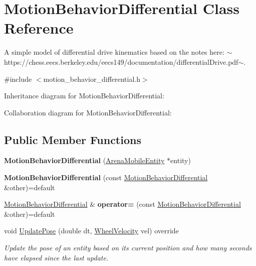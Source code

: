 \hypertarget{classMotionBehaviorDifferential}{}\section{Motion\+Behavior\+Differential Class Reference}
\label{classMotionBehaviorDifferential}


A simple model of differential drive kinematics based on the notes here\+: $\sim$https\+://chess.eecs.\+berkeley.\+edu/eecs149/documentation/differential\+Drive.pdf$\sim$.  




{\ttfamily \#include $<$motion\+\_\+behavior\+\_\+differential.\+h$>$}



Inheritance diagram for Motion\+Behavior\+Differential\+:


Collaboration diagram for Motion\+Behavior\+Differential\+:
\subsection*{Public Member Functions}
\begin{DoxyCompactItemize}
\item 
{\bfseries Motion\+Behavior\+Differential} (\hyperlink{classArenaMobileEntity}{Arena\+Mobile\+Entity} $\ast$entity)\hypertarget{classMotionBehaviorDifferential_a8815791ac85212945862454560279d28}{}\label{classMotionBehaviorDifferential_a8815791ac85212945862454560279d28}

\item 
{\bfseries Motion\+Behavior\+Differential} (const \hyperlink{classMotionBehaviorDifferential}{Motion\+Behavior\+Differential} \&other)=default\hypertarget{classMotionBehaviorDifferential_aeaa480aac3de205e1d177c4b4ad73ed6}{}\label{classMotionBehaviorDifferential_aeaa480aac3de205e1d177c4b4ad73ed6}

\item 
\hyperlink{classMotionBehaviorDifferential}{Motion\+Behavior\+Differential} \& {\bfseries operator=} (const \hyperlink{classMotionBehaviorDifferential}{Motion\+Behavior\+Differential} \&other)=default\hypertarget{classMotionBehaviorDifferential_aaf4edbc2e349cb8cdbb033b16b1aef22}{}\label{classMotionBehaviorDifferential_aaf4edbc2e349cb8cdbb033b16b1aef22}

\item 
void \hyperlink{classMotionBehaviorDifferential_a929c3a05aa2072acf2a508109b1259ef}{Update\+Pose} (double dt, \hyperlink{structWheelVelocity}{Wheel\+Velocity} vel) override
\begin{DoxyCompactList}\small\item\em Update the pose of an entity based on its current position and how many seconds have elapsed since the last update. \end{DoxyCompactList}\end{DoxyCompactItemize}
